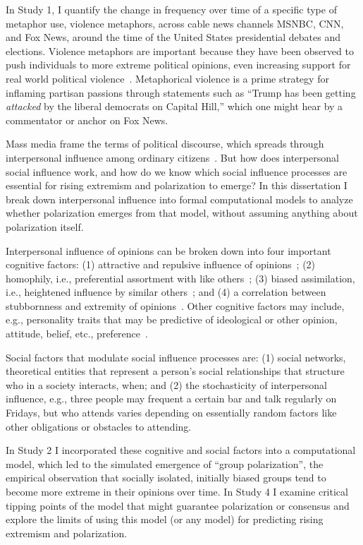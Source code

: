 \documentclass[12pt,letterpaper]{article}
\begin{document}
In Study 1, I quantify the change in frequency over time of a 
specific type of metaphor use, violence metaphors, across cable news channels
MSNBC, CNN, and Fox News, around the time of the United States presidential
debates and elections. Violence metaphors are important because they have
been observed to push individuals to more extreme political opinions, even
increasing support for real world political violence~\cite{Kalmoe2014,Kalmoe2018}.
Metaphorical violence is a prime strategy for inflaming partisan passions 
through statements such as ``Trump has been getting \emph{attacked} by the liberal
democrats on Capital Hill,'' which one might hear by a commentator or anchor on Fox News.

Mass media frame the terms of political discourse, which spreads through
interpersonal influence among ordinary citizens~\cite{Katz1955}. But how does 
interpersonal social influence work, and how do we know which social 
influence processes are essential for rising extremism and polarization to
emerge? In this dissertation I break down interpersonal influence into formal computational
models to analyze whether polarization emerges from that model, without assuming anything
about polarization itself. 

Interpersonal influence of opinions can be broken down into
four important cognitive factors: (1) attractive and repulsive influence of
opinions~\cite{French1956,Cikara2014,Bail2018}; (2) homophily, i.e., preferential assortment with like others~\cite{McPherson2001};
(3) biased assimilation, i.e., heightened influence by similar others~\cite{Dandekar2013}; and
(4) a correlation between stubbornness and extremity of opinions~\cite{Reiss2019,Zmigrod2019a}. 
Other cognitive factors may include, e.g., personality traits that may be predictive of 
ideological or other opinion, attitude, belief, etc., preference~\cite{Zmigrod2018}.

Social factors that modulate social influence processes are: (1) social
networks, theoretical entities that represent a person's social relationships
that structure who in a society interacts, when; and (2) the stochasticity
of interpersonal influence, e.g., three people may frequent a certain bar
and talk regularly on Fridays, but who attends varies depending on essentially
random factors like other obligations or obstacles to attending. 

In Study 2 I incorporated these cognitive and social factors into a 
computational model, which led to the simulated emergence of 
``group polarization'', the empirical 
observation that socially isolated, initially biased groups tend to become
more extreme in their opinions over time. In Study 4 I examine critical
tipping points of the model that might guarantee polarization or consensus and
explore the limits of using this model (or any model) for predicting 
rising extremism and polarization.
\end{document}
